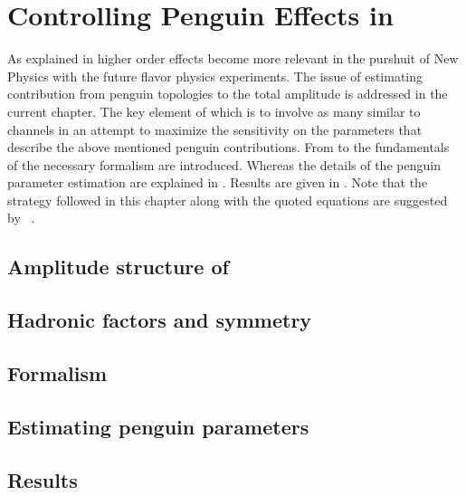 
\chapter{Controlling Penguin Effects in \phis}
\label{Penguins}

As explained in  higher order effects become more relevant in the purshuit
of New Physics with the future flavor physics experiments. The issue of estimating contribution from penguin topologies
to the total \BsJpsiPhi amplitude is addressed in the current chapter. The key element of which
is to involve as many similar to \BsJpsiPhi channels in an attempt to maximize the sensitivity on
the parameters that describe the above mentioned penguin contributions. From 
to  the fundamentals of the necessary formalism are introduced.
Whereas the details of the penguin parameter estimation are explained in .
Results are given in . Note that the strategy followed in this chapter
along with the quoted equations are suggested by ~\cite{Fleischer:1999zi,Faller:2008gt,DeBruyn:2014oga}.

\section{Amplitude structure of \BsJpsiPhi}
\label{jpsiphi_amp_struct}


\section{Hadronic factors and \grpsuthree symmetry}
\label{had_pars_suthree}


\section{Formalism}
\label{penguin_formalism}


\section{Estimating penguin parameters}
\label{penguin_more_chanells}


\section{Results}
\label{penguin_results}

